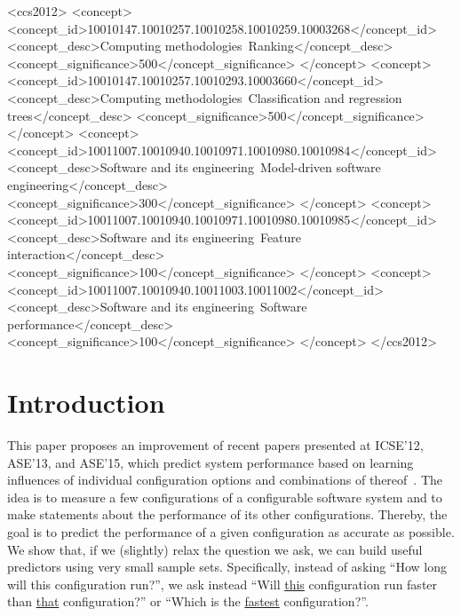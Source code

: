 \documentclass[sigconf]{acmart}
\begin{document}
\begin{CCSXML} 
<ccs2012> 
<concept> 
<concept_id>10010147.10010257.10010258.10010259.10003268</concept_id> 
<concept_desc>Computing methodologies~Ranking</concept_desc> 
<concept_significance>500</concept_significance> 
</concept> 
<concept> 
<concept_id>10010147.10010257.10010293.10003660</concept_id> 
<concept_desc>Computing methodologies~Classification and regression trees</concept_desc> 
<concept_significance>500</concept_significance> 
</concept> 
<concept> 
<concept_id>10011007.10010940.10010971.10010980.10010984</concept_id> 
<concept_desc>Software and its engineering~Model-driven software engineering</concept_desc> 
<concept_significance>300</concept_significance> 
</concept> 
<concept> 
<concept_id>10011007.10010940.10010971.10010980.10010985</concept_id> 
<concept_desc>Software and its engineering~Feature interaction</concept_desc> 
<concept_significance>100</concept_significance> 
</concept> 
<concept> 
<concept_id>10011007.10010940.10011003.10011002</concept_id> 
<concept_desc>Software and its engineering~Software performance</concept_desc> 
<concept_significance>100</concept_significance> 
</concept> 
</ccs2012> 
\end{CCSXML}
 

 
 



\maketitle


\section{Introduction}
This paper proposes an improvement of recent papers presented at ICSE'12, ASE'13, and ASE'15, which predict system performance based on learning influences of individual configuration options and combinations of thereof~\cite{siegmund2012predicting,guo2013variability,sarkar2015cost}. The idea is to measure a few configurations of a configurable software system and to make statements about the performance of its other configurations. Thereby, the goal is to predict the performance of a given configuration as accurate as possible.
We show that, if we (slightly) relax the
question we ask, we can build useful predictors using very small sample sets. Specifically,
instead of asking ``How long will this configuration run?'', we
ask instead ``Will \underline{this} configuration run faster than \underline{that} configuration?'' or ``Which is the \underline{fastest} configuration?''. 
\end{document}
